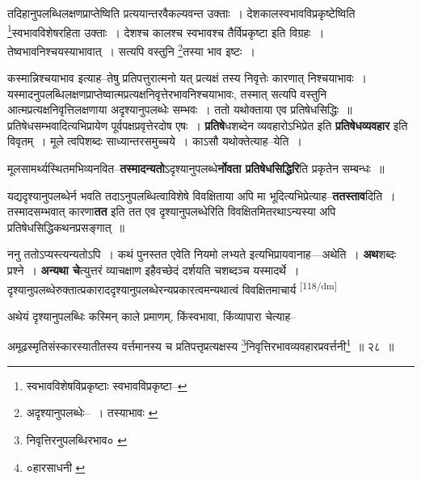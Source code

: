 \documentclass[article,12pt,a4paper]{memoir}
\begin{document}
	तदिहानुपलब्धिलक्षणप्राप्तेष्विति प्रत्ययान्तरवैकल्यवन्त उक्ताः । देशकालस्वभावविप्रकृष्टेष्विति \footnote{स्वभावविशेषविप्रकृष्टाः \cite{dp-msA} \cite{dp-edP} \cite{dp-edH} \cite{dp-edE} \cite{dp-edN} स्वभावविप्रकृष्टा--\cite{dp-msC}}स्वभावविशेषरहिता उक्ताः । देशश्च कालश्च स्वभावश्च तैर्विप्रकृष्टा इति विग्रहः । तेष्वभावनिश्चयस्याभावात् । सत्यपि वस्तुनि \footnote{अदृश्यानुपलब्धेः--\cite{dp-msD-n} । तस्याभावः \cite{dp-edP} \cite{dp-edH} \cite{dp-edE} \cite{dp-edN}}तस्या भाव इष्टः । 
	  
	कस्मान्निश्चयाभाव इत्याह--तेषु प्रतिपत्तुरात्मनो यत् प्रत्यक्षं तस्य निवृत्तेः कारणात् निश्चयाभावः । यस्मादनुपलब्धिलक्षणप्राप्तेष्वात्मप्रत्यक्षनिवृत्तेरभावनिश्चयाभावः, तस्मात् सत्यपि वस्तुनि आत्मप्रत्यक्षनिवृत्तिलक्षणाया अदृश्यानुपलब्धेः सम्भवः । ततो यथोक्ताया एव प्रतिषेधसिद्धिः ॥ प्रतिषेधसम्भवादित्यभिप्रायेण पूर्वपक्षप्रवृत्तेरदोष एषः । \textbf{प्रतिषे}धशब्देन व्यवहारोऽभिप्रेत इति \textbf{प्रतिषेधव्यवहार} इति विवृतम् । मूले त्वपिशब्दः साध्यान्तरसमुच्चये । काऽसौ यथोक्तेत्याह--येति ।
	\pend
      

	  \pstart मूलसामर्थ्यस्थितमभिव्यनवित--\textbf{तस्मादन्यतो}ऽदृश्यानुपलब्धे\textbf{र्नोवता प्रतिषेधसिद्धिरि}ति प्रकृतेन सम्बन्धः ॥
	\pend
      

	  \pstart यद्यदृश्यानुपलब्धेर्न भवति तदाऽनुपलब्धित्वाविशेषे विवक्षिताया अपि मा भूदित्यभिप्रेत्याह--\textbf{ततस्ताव}दिति । तस्मादसम्भवात् कारणा\textbf{तत} इति तत एव दृश्यानुपलब्धेरिति विवक्षितमितरथाऽन्यस्या अपि प्रतिषेधसिद्धिकथनप्रसङ्गात् ॥
	\pend
      

	  \pstart ननु ततोऽप्यस्त्यन्यतोऽपि । कथं पुनस्तत एवेति नियमो लभ्यते इत्यभिप्रायवानाह—अथेति । \textbf{अथ}शब्दः प्रश्ने । \textbf{अन्यथा चे}त्युत्तरं व्याचक्षाण इहैवच्छेदं दर्शयति चशब्दञ्च यस्मादर्थे । दृश्यानुपलब्धेरुक्तात्प्रकाराददृश्यानुपलब्धेरन्यप्रकारत्वमन्यथात्वं विवक्षितमाचार्य  \leavevmode\textsuperscript{\rmlatinfont\tiny [118/dm]} 
	  
	अथेयं दृश्यानुपलब्धिः कस्मिन् काले प्रमाणम्, किंस्वभावा, किंव्यापारा चेत्याह-- 
	  
	अमूढस्मृतिसंस्कारस्यातीतस्य वर्त्तमानस्य च प्रतिपत्तृप्रत्यक्षस्य \footnote{निवृत्तिरनुपलब्धिरभाव० \cite{dp-msC} \cite{dp-msD}}निवृत्तिरभावव्यवहारप्रवर्त्तनी\footnote{०हारसाधनी \cite{dp-msB} \cite{dp-msC} \cite{dp-msD} \cite{dp-edP} \cite{dp-edH} \cite{dp-edE} \cite{dp-edN}} ॥ २८ ॥ 
	  
\end{document}

